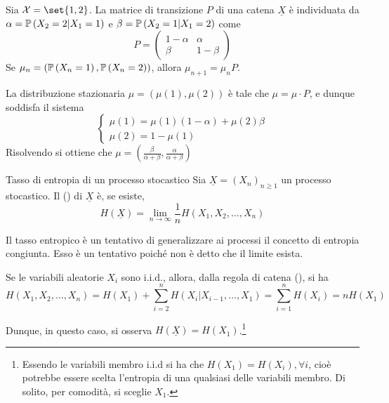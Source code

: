 \begin{example}{}
  Sia \(\mathcal{X} = \set{1,2}\). La matrice di transizione \(P\) di una catena \(\underline{X}\) è individuata da \(\alpha = \Prob[X_2 = 2 | X_1 = 1]\) e \(\beta = \Prob[X_2 = 1 | X_1 = 2]\) come
  \begin{equation*}
    P = \begin{pmatrix}
      1-\alpha & \alpha \\
      \beta & 1-\beta
    \end{pmatrix}
  \end{equation*}
  Se \(\mu_n = (\Prob[X_n = 1], \Prob[X_n = 2])\), allora \(\mu_{n+1} = \mu_n P\).

  La distribuzione stazionaria \(\mu = (\mu(1), \mu(2))\) è tale che \(\mu = \mu \cdot P\), e dunque soddisfa il sistema
  \begin{equation*}
    \begin{cases}
      \mu(1) = \mu(1)(1-\alpha) + \mu(2) \beta \\
      \mu(2) = 1 - \mu(1)
    \end{cases}
  \end{equation*}
  Risolvendo si ottiene che \(\mu = \left(\frac{\beta}{\alpha+\beta}, \frac{\alpha}{\alpha+\beta}\right)\)
\end{example}

\begin{definition}{Tasso di entropia di un processo stocastico}
  Sia \(\underline{X} = {(X_n)}_{n\geq 1}\) un processo stocastico.
  Il  () di \(\underline{X}\) è, se esiste,
  \[H(\underline{X}) = \lim_{n\to\infty} \frac{1}{n} H(X_1, X_2, \ldots, X_n)\]
\end{definition}

Il tasso entropico è un tentativo di generalizzare ai processi il concetto di entropia congiunta. Esso è un tentativo poiché non è detto che il limite esista.

Se le variabili aleatorie \(X_i\) sono i.i.d., allora, dalla regola di catena (), si ha
  \[H(X_1, X_2, \ldots, X_n) = H(X_1) + \sum_{i=2}^n H(X_i|X_{i-1}, \ldots, X_1) = \sum_{i=1}^n H(X_i) = n H(X_1)\]

Dunque, in questo caso, si osserva \(H(\underline{X}) = H(X_1)\).\footnote{Essendo le variabili membro i.i.d si ha che \(H(X_1) = H(X_i), \forall i\), cioè potrebbe essere scelta l'entropia di una qualsiasi delle variabili membro. Di solito, per comodità, si sceglie $X_1$.}

